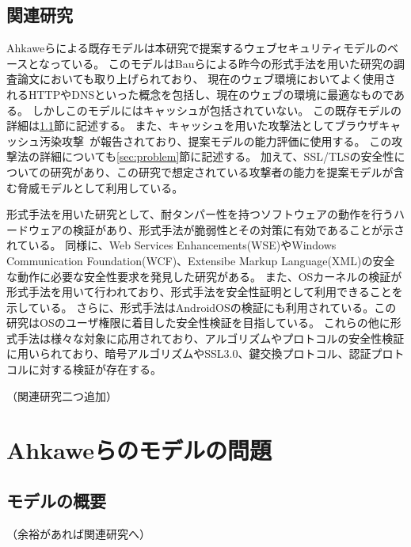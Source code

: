\documentclass{css}
\begin{document}
\subsection{関連研究}
Ahkaweらによる既存モデル\cite{webmodel}は本研究で提案するウェブセキュリティモデルのベースとなっている。
このモデルはBauらによる昨今の形式手法を用いた研究の調査論文\cite{security_modeling_and_analysis}においても取り上げられており、
現在のウェブ環境においてよく使用されるHTTPやDNSといった概念を包括し、現在のウェブの環境に最適なものである。
しかしこのモデルにはキャッシュが包括されていない。
この既存モデルの詳細は\ref{sec:existingmodel}節に記述する。
また、キャッシュを用いた攻撃法としてブラウザキャッシュ汚染攻撃~\cite{bcpattack}が報告されており、提案モデルの能力評価に使用する。
この攻撃法の詳細についても\ref{sec:problem}節に記述する。
加えて、SSL/TLSの安全性についての研究\cite{securing_frame_communication_in_browsers}があり、この研究で想定されている攻撃者の能力を提案モデルが含む脅威モデルとして利用している。

形式手法を用いた研究として、耐タンパー性を持つソフトウェアの動作を行うハードウェアの検証\cite{specifying_and_verifying_hardware_for}があり、形式手法が脆弱性とその対策に有効であることが示されている。
同様に、Web Services Enhancements(WSE)やWindows Communication Foundation(WCF)、Extensibe Markup Language(XML)の安全な動作に必要な安全性要求を発見した研究\cite{TFFWS27,TFFWS28}がある。
また、OSカーネルの検証\cite{sel4_formal_verification_of_an}が形式手法を用いて行われており、形式手法を安全性証明として利用できることを示している。
さらに、形式手法はAndroidOSの検証\cite{towards_formal_analysis_of_the}にも利用されている。この研究はOSのユーザ権限に着目した安全性検証を目指している。
これらの他に形式手法は様々な対象に応用されており、アルゴリズムやプロトコルの安全性検証に用いられており、暗号アルゴリズムやSSL3.0、鍵交換プロトコル、認証プロトコルに対する検証が存在する\cite{TFFWS17,TFFWS18,TFFWS19,TFFWS20}。

\color{red}
（関連研究二つ追加）
\color{black}

\section{Ahkaweらのモデルの問題}

\subsection{モデルの概要}
\label{sec:existingmodel}
\color{red}
（余裕があれば関連研究へ）
\color{black}
\end{document}
